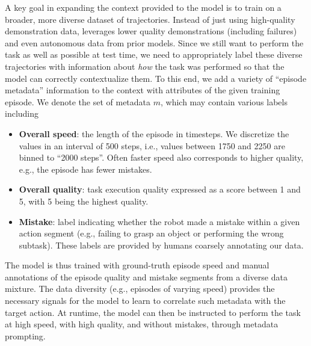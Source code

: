 
\label{subsec:metadata}

A key goal in expanding the context provided to the model is to train on a broader, more diverse dataset of trajectories. Instead of just using high-quality demonstration data, \MethodName{} leverages lower quality demonstrations (including failures) and even autonomous data from prior models. Since we still want \MethodName{} to perform the task as well as possible at test time, we need to appropriately label these diverse trajectories with information about \emph{how} the task was performed so that the model can correctly contextualize them. To this end, we add a variety of ``episode metadata'' information to the context with attributes of the given training episode. We denote the set of metadata $m$, which may contain various labels including



\begin{itemize}[leftmargin=10pt]
    \item \textbf{Overall speed}: the length of the episode in timesteps. We discretize the values in an interval of 500 steps, i.e., values between 1750 and 2250 are binned to ``2000 steps''. Often faster speed also corresponds to higher quality, e.g., the episode has fewer mistakes.
    \item \textbf{Overall quality}: task execution quality expressed as a score between 1 and 5, with 5 being the highest quality.
    \item \textbf{Mistake}: label indicating whether the robot made a mistake within a given action segment (e.g., failing to grasp an object or performing the wrong subtask). These labels are provided by humans coarsely annotating our data.
\end{itemize}

The \MethodName{} model is thus trained with ground-truth episode speed and manual annotations of the episode quality and mistake segments from a diverse data mixture. The data diversity (e.g., episodes of varying speed) provides the necessary signals for the model to learn to correlate such metadata with the target action.
At runtime, the model can then be instructed to perform the task at high speed, with high quality, and without mistakes, through metadata prompting.

